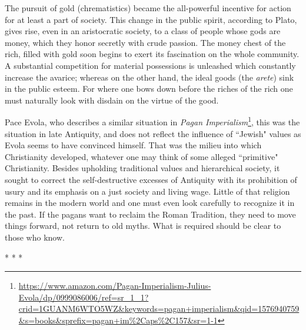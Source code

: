 \begin{quotex}
The pursuit of gold (chrematistics) became the all-powerful incentive for action for at least a part of society. This change in the public spirit, according to Plato, gives rise, even in an aristocratic society, to a class of people whose gods are money, which they honor secretly with crude passion. The money chest of the rich, filled with gold soon begins to exert its fascination on the whole community. A substantial competition for material possessions is unleashed which constantly increase the avarice; whereas on the other hand, the ideal goods (the \emph{arete}) sink in the public esteem. For where one bows down before the riches of the rich one must naturally look with disdain on the virtue of the good.

\end{quotex}
Pace Evola, who describes a similar situation in \textit{Pagan Imperialism}\footnote{\url{https://www.amazon.com/Pagan-Imperialism-Julius-Evola/dp/0999086006/ref=sr_1_1?crid=1GUANM6WTO5WZ\&keywords=pagan+imperialism\&qid=1576940759\&s=books\&sprefix=pagan+im\%2Caps\%2C157\&sr=1-1}}, this was the situation in late Antiquity, and does not reflect the influence of ``Jewish" values as Evola seems to have convinced himself. That was the milieu into which Christianity developed, whatever one may think of some alleged ``primitive" Christianity. Besides upholding traditional values and hierarchical society, it sought to correct the self-destructive excesses of Antiquity with its prohibition of usury and its emphasis on a just society and living wage. Little of that religion remains in the modern world and one must even look carefully to recognize it in the past. If the pagans want to reclaim the Roman Tradition, they need to move things forward, not return to old myths. What is required should be clear to those who know.




\begin{center}* * *\end{center}

